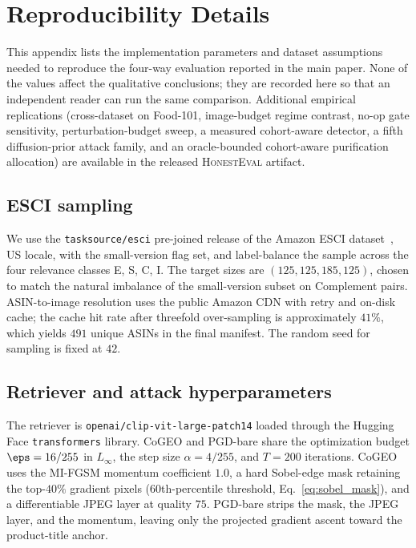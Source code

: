 \section{Reproducibility Details}
\label{app:repro}

This appendix lists the implementation parameters and dataset assumptions needed to reproduce the four-way evaluation reported in the main paper. None of the values affect the qualitative conclusions; they are recorded here so that an independent reader can run the same comparison. Additional empirical replications (cross-dataset on Food-101, image-budget regime contrast, no-op gate sensitivity, perturbation-budget sweep, a measured cohort-aware detector, a fifth diffusion-prior attack family, and an oracle-bounded cohort-aware purification allocation) are available in the released \textsc{HonestEval} artifact.

\subsection{ESCI sampling}

We use the \texttt{tasksource/esci} pre-joined release of the Amazon ESCI dataset~\cite{reddy2022esci}, US locale, with the small-version flag set, and label-balance the sample across the four relevance classes E, S, C, I. The target sizes are $(125, 125, 185, 125)$, chosen to match the natural imbalance of the small-version subset on Complement pairs. ASIN-to-image resolution uses the public Amazon CDN with retry and on-disk cache; the cache hit rate after threefold over-sampling is approximately $41\%$, which yields $491$ unique ASINs in the final manifest. The random seed for sampling is fixed at $42$.

\subsection{Retriever and attack hyperparameters}

The retriever is \texttt{openai/clip-vit-large-patch14} loaded through the Hugging Face \texttt{transformers} library. CoGEO and PGD-bare share the optimization budget $\eps = 16/255$ in $L_\infty$, the step size $\alpha = 4/255$, and $T = 200$ iterations. CoGEO uses the MI-FGSM momentum coefficient $1.0$, a hard Sobel-edge mask retaining the top-$40\%$ gradient pixels ($60$th-percentile threshold, Eq.~\ref{eq:sobel_mask}), and a differentiable JPEG layer at quality $75$. PGD-bare strips the mask, the JPEG layer, and the momentum, leaving only the projected gradient ascent toward the product-title anchor.

